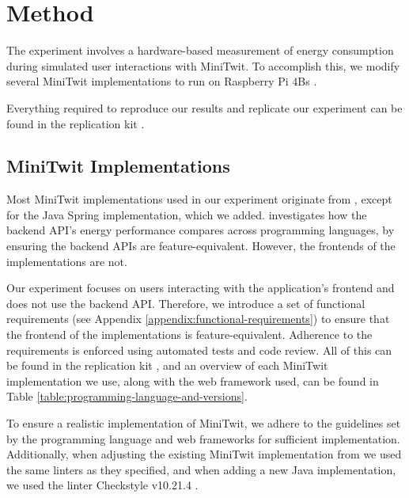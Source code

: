 \documentclass[main.tex]{subfiles}
\begin{document}
\section{Method}
\label{section:method}
The experiment involves a hardware-based measurement of energy consumption during simulated user interactions with MiniTwit. To accomplish this, we modify several MiniTwit implementations to run on Raspberry Pi 4Bs \cite{raspberrypi2025productbrief}.

Everything required to reproduce our results and replicate our experiment can be found in the replication kit \cite{replication-kit-Karlsen_Landsgaard_Offenberg_Pedersen_2025}.

\subsection{MiniTwit Implementations}
Most MiniTwit implementations used in our experiment originate from \textcite{Pfeiffer_Trindade_Meding_Harwick} , except for the Java Spring implementation, which we added. \textcite{Pfeiffer_Trindade_Meding_Harwick} investigates how the backend API's energy performance compares across programming languages, by ensuring the backend APIs are feature-equivalent. However, the frontends of the implementations are not.

Our experiment focuses on users interacting with the application's frontend and does not use the backend API. Therefore, we introduce a set of functional requirements (see Appendix \ref{appendix:functional-requirements}) to ensure that the frontend of the implementations is feature-equivalent. Adherence to the requirements is enforced using automated tests and code review. All of this can be found in the replication kit \cite{replication-kit-Karlsen_Landsgaard_Offenberg_Pedersen_2025}, and an overview of each MiniTwit implementation we use, along with the web framework used, can be found in Table \ref{table:programming-language-and-versions}.

To ensure a realistic implementation of MiniTwit, we adhere to the guidelines set by the programming language and web frameworks for sufficient implementation. Additionally, when adjusting the existing MiniTwit implementation from \textcite{Pfeiffer_Trindade_Meding_Harwick} we used the same linters as they specified, and when adding a new Java implementation, we used the linter Checkstyle v10.21.4 \cite{checkstyleReleaseNotes}.
\end{document}
